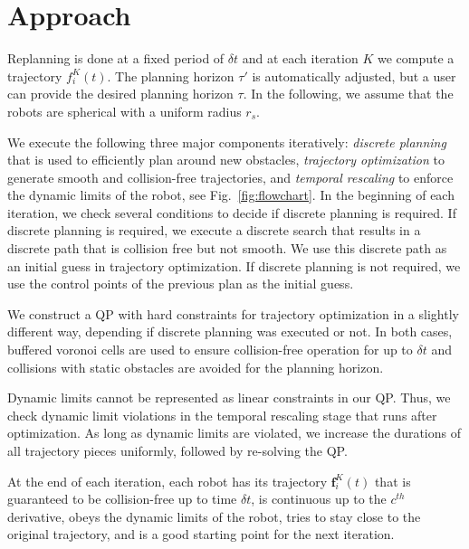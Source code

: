 \documentclass{svproc}
\newcommand{\vf}{\mathbf{f}}
\begin{document}
\section{Approach}


Replanning is done at a fixed period of $\delta t$ and at each iteration $K$ we compute a trajectory $f^K_i(t)$.
The planning horizon $\tau'$ is automatically adjusted, but a user can provide the desired planning horizon $\tau$.
In the following, we assume that the robots are spherical with a uniform radius $r_s$.

We execute the following three major components iteratively: \emph{discrete planning} that is used to efficiently plan around new obstacles, \emph{trajectory optimization} to generate smooth and collision-free trajectories, and \emph{temporal rescaling} to enforce the dynamic limits of the robot, see Fig.~\ref{fig:flowchart}.
In the beginning of each iteration, we check several conditions to decide if discrete planning is required.
If discrete planning is required, we execute a discrete search that results in a discrete path that is collision free but not smooth.
We use this discrete path as an initial guess in trajectory optimization.
If discrete planning is not required, we use the control points of the previous plan as the initial guess.

We construct a QP with hard constraints for trajectory optimization in a slightly different way, depending if discrete planning was executed or not.
In both cases, buffered voronoi cells are used to ensure collision-free operation for up to $\delta t$ and collisions with static obstacles are avoided for the planning horizon.

Dynamic limits cannot be represented as linear constraints in our QP.
Thus, we check dynamic limit violations in the temporal rescaling stage that runs after optimization.
As long as dynamic limits are violated, we increase the durations of all trajectory pieces uniformly, followed by re-solving the QP.

At the end of each iteration, each robot has its trajectory $\vf^{K}_i(t)$ that is guaranteed to be collision-free up to time $\delta t$, is continuous up to the $c^{th}$ derivative, obeys the dynamic limits of the robot, tries to stay close to the original trajectory, and is a good starting point for the next iteration.
\end{document}
